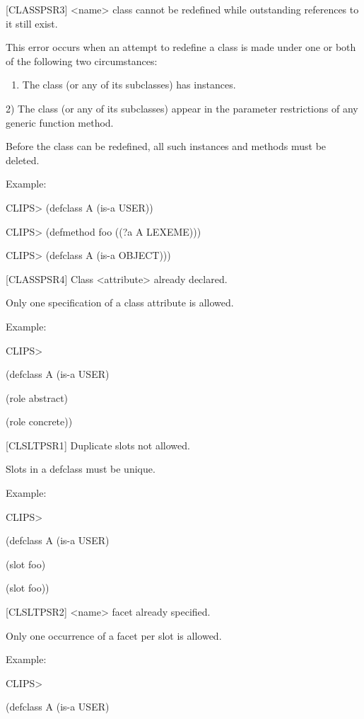 \documentclass[letterpaper,10pt,english]{sphinxmanual}
\begin{document}
{[}CLASSPSR3{]} \textless{}name\textgreater{} class cannot be redefined while outstanding
references to it still exist.

This error occurs when an attempt to redefine a class is made under one
or both of the following two circumstances:
\begin{enumerate}
\def\theenumi{\arabic{enumi}}
\def\labelenumi{\theenumi )}
\makeatletter\def\p@enumii{\p@enumi \theenumi )}\makeatother
\item {} 
The class (or any of its subclasses) has instances.

\end{enumerate}

2) The class (or any of its subclasses) appear in the parameter
restrictions of any generic function method.

Before the class can be redefined, all such instances and methods must
be deleted.

Example:

CLIPS\textgreater{} (defclass A (is-a USER))

CLIPS\textgreater{} (defmethod foo ((?a A LEXEME)))

CLIPS\textgreater{} (defclass A (is-a OBJECT)))

{[}CLASSPSR4{]} Class \textless{}attribute\textgreater{} already declared.

Only one specification of a class attribute is allowed.

Example:

CLIPS\textgreater{}

(defclass A (is-a USER)

(role abstract)

(role concrete))

{[}CLSLTPSR1{]} Duplicate slots not allowed.

Slots in a defclass must be unique.

Example:

CLIPS\textgreater{}

(defclass A (is-a USER)

(slot foo)

(slot foo))

{[}CLSLTPSR2{]} \textless{}name\textgreater{} facet already specified.

Only one occurrence of a facet per slot is allowed.

Example:

CLIPS\textgreater{}

(defclass A (is-a USER)
\end{document}
